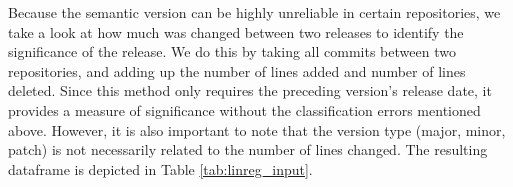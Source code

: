 \begin{table}
    \centering
    \caption{OLS regression input data. (b=before, a=after)}
    \label{tab:linreg_input}
\end{table}

Because the semantic version can be highly unreliable in certain repositories, we take a look at how much was changed between two releases to identify the significance of the release. We do this by taking all commits between two repositories, and adding up the number of lines added and number of lines deleted. Since this method only requires the preceding version's release date, it provides a measure of significance without the classification errors mentioned above. However, it is also important to note that the version type (major, minor, patch) is not necessarily related to the number of lines changed. The resulting dataframe is depicted in Table \ref{tab:linreg_input}.

